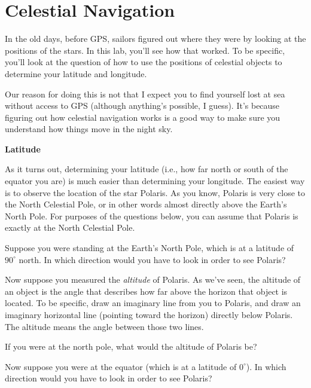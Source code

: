 \section{Celestial Navigation}

\makelabheader

\bigskip

In the old days, before GPS, sailors figured out where they were
by looking at the positions of the stars. In this lab, you'll
see how that worked. To be specific, you'll look at the question
of how to use the positions of celestial 
objects to determine your latitude and longitude.

Our reason for doing this is not that I expect you to find yourself
lost at sea without access to GPS (although anything's possible,
I guess). It's because
figuring out how celestial navigation works is a good way to make
sure you understand how things move in the night sky.

{\bf Latitude}

As it turns out, determining your latitude (i.e., how far north or
south of the equator you are) is much easier than determining your longitude.
The easiest way is to observe the location of the star Polaris.
As you know, Polaris is very close to the North Celestial Pole, or in
other words almost directly above the Earth's North Pole. For
purposes of the questions below, you can assume that Polaris is
exactly at the North Celestial Pole.

Suppose you were standing at the Earth's North Pole, which is at a latitude
of $90^\circ$ north. In which direction would you have to look
in order to see Polaris?

\answerspace{1in}

Now suppose you measured the \textit{altitude} of Polaris. 
As we've seen, the 
altitude of an object is the angle that describes how far above
the horizon that object is located. To be specific, draw an imaginary
line from you to Polaris, and draw an imaginary horizontal line (pointing
toward the horizon) directly below Polaris. The altitude means
the angle between those two lines.

If you were at the north pole, what would the altitude of Polaris be?

\answerspace{1in}

\pagebreak[2]
Now suppose you were at the equator (which is at a latitude
of $0^\circ$). In which direction would you have to look in order to see
Polaris?

